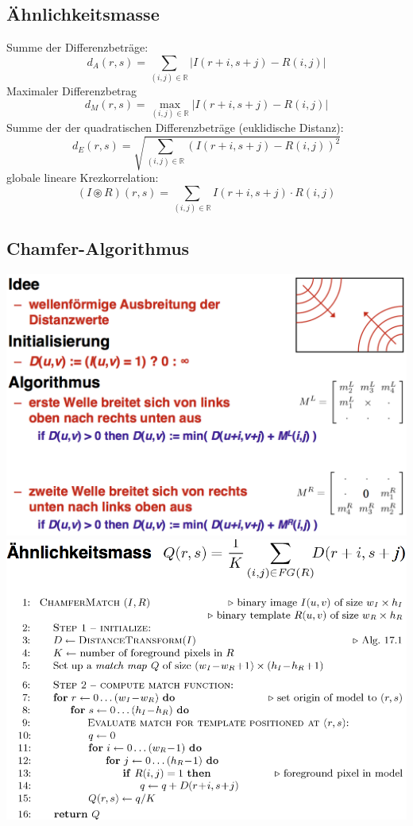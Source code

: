 \documentclass[10pt]{article}
\newcommand{\RN}{\mathbb{R}} %
\begin{document}
\subsection{Ähnlichkeitsmasse}
Summe der Differenzbeträge:
\begin{equation*}
	d_A(r, s) = \sum_{(i,j) \in \RN} | I(r+i,s+j) - R(i,j)|
\end{equation*}
Maximaler Differenzbetrag
\begin{equation*}
	d_M(r, s) = \max_{(i,j) \in \RN} | I(r+i,s+j) - R(i,j)|
\end{equation*}
Summe der der quadratischen Differenzbeträge (euklidische Distanz):
\begin{equation*}
	d_E(r, s) = \sqrt{\sum_{(i,j) \in \RN} \left( I(r+i,s+j) - R(i,j) \right)^2}
\end{equation*}
globale lineare Krezkorrelation:
\begin{equation*}
	( I \circledast R)(r,s) = \sum_{(i,j) \in \RN}  I(r+i,s+j) \cdot R(i,j) 
\end{equation*}

\subsection{Chamfer-Algorithmus}
\begin{center}
	\includegraphics[scale=0.2]{chamfer-alg.png}
	\hspace{1cm}
	\includegraphics[scale=0.2]{chamfer-match.png}
\end{center}
\end{document}
